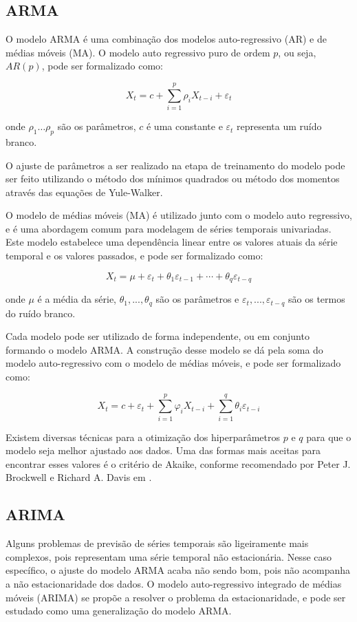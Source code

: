 \subsection{ARMA}
O modelo ARMA é uma combinação dos modelos auto-regressivo (AR) e de médias móveis (MA). O modelo auto regressivo puro de ordem $p$, ou seja, $AR(p)$, pode ser formalizado como:

\[X_{t}=c+\sum ^{p}_{i=1}\rho _{i}X_{t-i}+\varepsilon _{t}\]

onde $\rho _{1}\ldots \rho _{p}$ são os parâmetros, $c$ é uma constante e $\varepsilon _{t}$ representa um ruído branco.

O ajuste de parâmetros a ser realizado na etapa de treinamento do modelo pode ser feito utilizando o método dos mínimos quadrados ou método dos momentos através das equações de Yule-Walker.

O modelo de médias móveis (MA) é utilizado junto com o modelo auto regressivo, e é uma abordagem comum para modelagem de séries temporais univariadas. Este modelo estabelece uma dependência linear entre os valores atuais da série temporal e os valores passados, e pode ser formalizado como:

\[X_{t}=\mu+\varepsilon_{t}+\theta_{1} \varepsilon_{t-1}+\cdots+\theta_{q} \varepsilon_{t-q}\]

onde $\mu$ é a média da série, $\theta_{1}, ..., \theta_{q}$ são os parâmetros e $\varepsilon_{t}, ..., \varepsilon_{t-q}$ são os termos do ruído branco.

Cada modelo pode ser utilizado de forma independente, ou em conjunto formando o modelo ARMA. A construção desse modelo se dá pela soma do modelo auto-regressivo com o modelo de médias móveis, e pode ser formalizado como:

\[X_{t}=c+\varepsilon_{t}+\sum_{i=1}^{p} \varphi_{i} X_{t-i}+\sum_{i=1}^{q} \theta_{i} \varepsilon_{t-i}\]

Existem diversas técnicas para a otimização dos hiperparâmetros $p$ e $q$ para que o modelo seja melhor ajustado aos dados. Uma das formas mais aceitas para encontrar esses valores é o critério de Akaike, conforme recomendado por Peter J. Brockwell e Richard A. Davis em \cite{akaike}.

\subsection{ARIMA}
Alguns problemas de previsão de séries temporais são ligeiramente mais complexos, pois representam uma série temporal não estacionária. Nesse caso específico, o ajuste do modelo ARMA acaba não sendo bom, pois não acompanha a não estacionaridade dos dados. O modelo auto-regressivo integrado de médias móveis (ARIMA) se propõe a resolver o problema da estacionaridade, e pode ser estudado como uma generalização do modelo ARMA.

